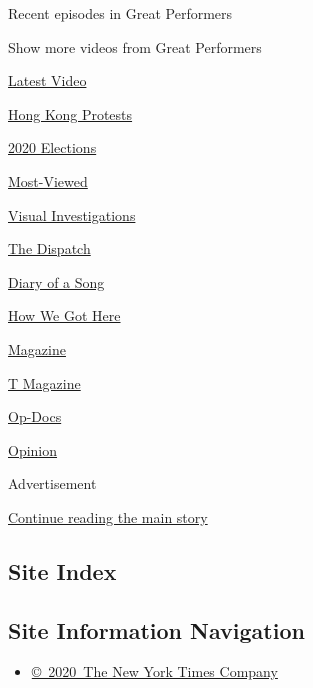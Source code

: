Recent episodes in Great Performers

Show more videos from Great Performers

\href{/video}{}

\href{/video/latest-video}{Latest Video}

\href{/video/hk-protest}{Hong Kong Protests}

\href{/video/2020-Elections}{2020 Elections}

\href{/video/Most-Viewed}{Most-Viewed}

\href{/video/investigations}{Visual Investigations}

\href{/video/on-the-ground}{The Dispatch}

\href{/video/diaryofasong}{Diary of a Song}

\href{/video/how-we-got-here}{How We Got Here}

\href{/video/magazine}{Magazine}

\href{/video/t-magazine}{T Magazine}

\href{/video/op-docs}{Op-Docs}

\href{/video/opinion}{Opinion}

Advertisement

\protect\hyperlink{after-bottom}{Continue reading the main story}

\hypertarget{site-index}{%
\subsection{Site Index}\label{site-index}}

\hypertarget{site-information-navigation}{%
\subsection{Site Information
Navigation}\label{site-information-navigation}}

\begin{itemize}
\tightlist
\item
  \href{https://help.nytimes3xbfgragh.onion/hc/en-us/articles/115014792127-Copyright-notice}{©~2020~The
  New York Times Company}
\end{itemize}

